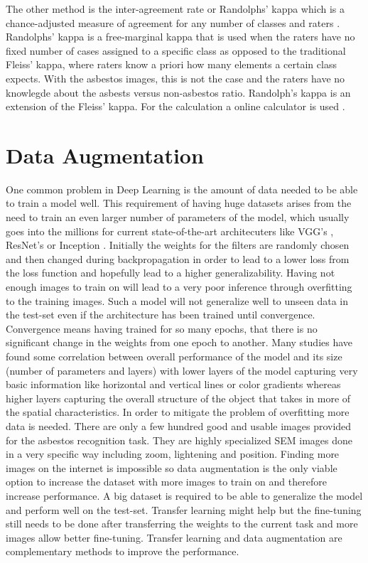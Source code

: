 The other method is the inter-agreement rate or Randolphs' kappa which is a chance-adjusted measure of agreement for any number of classes and raters \cite{randolph2005free}. Randolphs' kappa is a free-marginal kappa that is used when the raters have no fixed number of cases assigned to a specific class as opposed to the traditional Fleiss' kappa, where raters know a priori how many elements a certain class expects. With the asbestos images, this is not the case and the raters have no knowlegde about the asbests versus non-asbestos ratio. Randolph's kappa is an extension of the Fleiss' kappa. For the calculation a online calculator is used \cite{humanlevel2014}.

\section{Data Augmentation}

One common problem in Deep Learning is the amount of data needed to be able to train a model well. This requirement of having huge datasets arises from the need to train an even larger number of parameters of the model, which usually goes into the millions for current state-of-the-art architecuters like VGG's \cite{simonyan2014very}, ResNet's \cite{he2016deep} or Inception \cite{szegedy2015going, szegedy2016rethinking}. Initially the weights for the filters are randomly chosen and then changed during backpropagation in order to lead to a lower loss from the loss function and hopefully lead to a higher generalizability. Having not enough images to train on will lead to a very poor inference through overfitting to the training images. Such a model will not generalize well to unseen data in the test-set even if the architecture has been trained until convergence. Convergence means having trained  for so many epochs, that there is no significant change in the weights from one epoch to another. Many studies have found some correlation between overall performance of the model and its size (number of parameters and layers) with lower layers of the model capturing very basic information like horizontal and vertical lines or color gradients whereas higher layers capturing the overall structure of the object that takes in more of the spatial characteristics. In order to mitigate the problem of overfitting more data is needed. There are only a few hundred good and usable images provided for the asbestos recognition task. They are highly specialized SEM images done in a very specific way including zoom, lightening and position. Finding more images on the internet is impossible so data augmentation is the only viable option to increase the dataset with more images to train on and therefore increase performance. A big dataset is required to be able to generalize the model and perform well on the test-set. Transfer learning might help but the fine-tuning still needs to be done after transferring the weights to the current task and more images allow better fine-tuning. Transfer learning and data augmentation are complementary methods to improve the performance.

